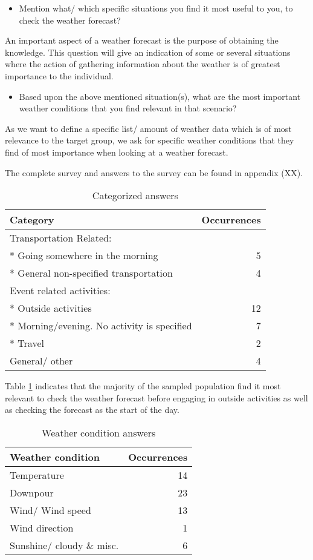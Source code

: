 \begin{itemize}
\item Mention what/ which specific situations you find it most useful to you, to check the weather forecast?
\end{itemize}
An important aspect of a weather forecast is the purpose of obtaining the knowledge. 
This question will give an indication of some or several situations where the action of gathering information about the weather is of greatest importance to the individual.

\begin{itemize}
\item Based upon the above mentioned situation(s), what are the most important weather conditions that you find relevant in that scenario?
\end{itemize}
As we want to define a specific list/ amount of weather data which is of most relevance to the target group, we ask for specific weather conditions that they find of most importance when looking at a weather forecast.


The complete survey and answers to the survey can be found in appendix (XX).
\bigskip

\begin{table}[!htbp]
\centering
\begin{tabular}{| l | r |}
\hline
\textbf{Category} & \textbf{Occurrences}\\
\hline
Transportation Related: & \\
* Going somewhere in the morning & 5 \\
* General non-specified transportation & 4 \\
Event related activities: & \\
* Outside activities & 12 \\
* Morning/evening. No activity is specified & 7 \\
* Travel & 2 \\
General/ other & 4 \\
\hline
\end{tabular}
\caption{Categorized answers} \label{tab:categorizedAnswers}
\end{table}

Table \ref{tab:categorizedAnswers} indicates that the majority of the sampled population find it most relevant to check the weather forecast before engaging in outside activities as well as checking the forecast as the start of the day.

\begin{table}[!htbp]
\centering
\begin{tabular}{| l | r |}
\hline
\textbf{Weather condition} & \textbf{Occurrences} \\
\hline
Temperature & 14 \\
Downpour & 23 \\
Wind/ Wind speed & 13 \\
Wind direction & 1 \\
Sunshine/ cloudy \& misc. & 6 \\
\hline
\end{tabular}
\caption{Weather condition answers} \label{tab:weatherConditions}
\end{table}

